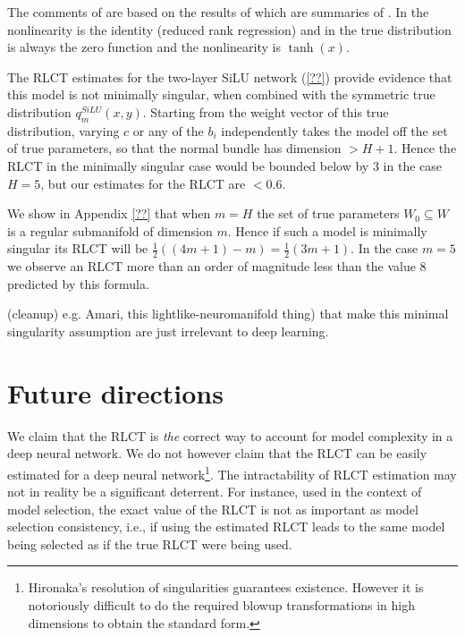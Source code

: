 \documentclass{article} %
\begin{document}
The comments of \citep[\S 7.6]{watanabe_algebraic_2009} are based on the results of \citep[\S 7.2]{watanabe_algebraic_2009} which are summaries of \cite{??,??}. In \cite{??} the nonlinearity is the identity (reduced rank regression) and in \cite{??} the true distribution is always the zero function and the nonlinearity is $\operatorname{tanh}(x)$.

The RLCT estimates for the two-layer SiLU network (\ref{??}) provide evidence that this model is not minimally singular, when combined with the symmetric true distribution $q^{SiLU}_m(x,y)$. Starting from the weight vector of this true distribution, varying $c$ or any of the $b_i$ independently takes the model off the set of true parameters, so that the normal bundle has dimension $> H + 1$. Hence the RLCT in the minimally singular case would be bounded below by $3$ in the case $H = 5$, but our estimates for the RLCT are $< 0.6$.

We show in Appendix \ref{??} that when $m = H$ the set of true parameters $W_0 \subseteq W$ is a regular submanifold of dimension $m$. Hence if such a model is minimally singular its RLCT will be $\tfrac{1}{2}( (4m + 1) - m ) = \tfrac{1}{2}( 3m + 1 )$. In the case $m = 5$ we observe an RLCT more than an order of magnitude less than the value $8$ predicted by this formula.

\begin{remark} (cleanup)
e.g. Amari, this lightlike-neuromanifold thing) that make this minimal singularity assumption are just irrelevant to deep learning.
\end{remark}

\section{Future directions}
We claim that the RLCT is \textit{the} correct way to account for model complexity in a deep neural network. We do not however claim that the RLCT can be easily estimated for a deep neural network\footnote{Hironaka's resolution of singularities guarantees existence. However it is notoriously difficult to do the required blowup transformations in high dimensions to obtain the standard form.}. The intractability of RLCT estimation may not in reality be a significant deterrent. For instance, used in the context of model selection, the exact value of the RLCT is not as important as model selection consistency, i.e., if using the estimated RLCT leads to the same model being selected as if the true RLCT were being used. 
\end{document}
